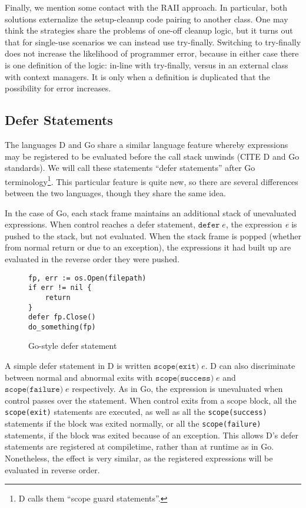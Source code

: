\documentclass[11pt]{article}
\newcommand{\maybePage}{\newpage}
\begin{document}
Finally, we mention some contact with the RAII approach.
In particular, both solutions externalize the setup-cleanup code pairing to another class.
One may think the strategies share the problems of one-off cleanup logic, but it turns out that for single-use scenarios we can instead use try-finally.
Switching to try-finally does not increase the likelihood of programmer error, because in either case there is one definition of the logic: in-line with try-finally, versus in an external class with context managers.
It is only when a definition is duplicated that the possibility for error increases.


\maybePage
\subsection{Defer Statements}
\label{defer}

The languages D and Go share a similar language feature whereby expressions may be registered to be evaluated before the call stack unwinds (CITE D and Go standards). We will call these statements ``defer statements'' after Go terminology\footnote{D calls them ``scope guard statements''.}. This particular feature is quite new, so there are several differences between the two languages, though they share the same idea.

In the case of Go, each stack frame maintains an additional stack of unevaluated expressions. When control reaches a defer statement, $\texttt{defer}\;e$, the expression \textit{e} is pushed to the stack, but not evaluated. When the stack frame is popped (whether from normal return or due to an exception), the expressions it had built up are evaluated in the reverse order they were pushed.

\begin{figure}[H]
\caption{Go-style defer statement}
\label{goDeferStatement}
\begin{verbatim}
fp, err := os.Open(filepath)
if err != nil {
    return
}
defer fp.Close()
do_something(fp)
\end{verbatim}
\end{figure}

A simple defer statement in D is written $\texttt{scope(exit)}\;e$.
D can also discriminate between normal and abnormal exits with $\texttt{scope(success)}\;e$ and $\texttt{scope(failure)}\;e$ respectively.
As in Go, the expression is unevaluated when control passes over the statement.
When control exits from a scope block, all the \texttt{scope(exit)} statements are executed, as well as all the \texttt{scope(success)} statements if the block was exited normally, or all the \texttt{scope(failure)} statements, if the block was exited because of an exception.
This allows D's defer statements are registered at compiletime, rather than at runtime as in Go.
Nonetheless, the effect is very similar, as the registered expressions will be evaluated in reverse order.
\end{document}
